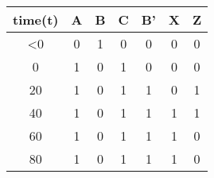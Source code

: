 \documentclass{article}
\begin{document}
\begin{center}
    \begin{tabular}{||c c c c c c c||}
    \hline
    time(t) & A & B & C & B' & X & Z\\[3ex]
    \hline\hline
    \textless0 & 0 & 1 & 0 & 0 & 0 & 0\\
    \hline
    0 & 1 & 0 & 1 & 0 & 0 & 0\\
    \hline
    20 & 1 & 0 & 1 & 1 & 0 & 1\\
    \hline
    40 & 1 & 0 & 1 & 1 & 1 & 1\\
    \hline
    60 & 1 & 0 & 1 & 1 & 1 & 0\\
    \hline
    80 & 1 & 0 & 1 & 1 & 1 & 0\\
    \hline
    \end{tabular}
    
    
\end{center}
\end{document}
